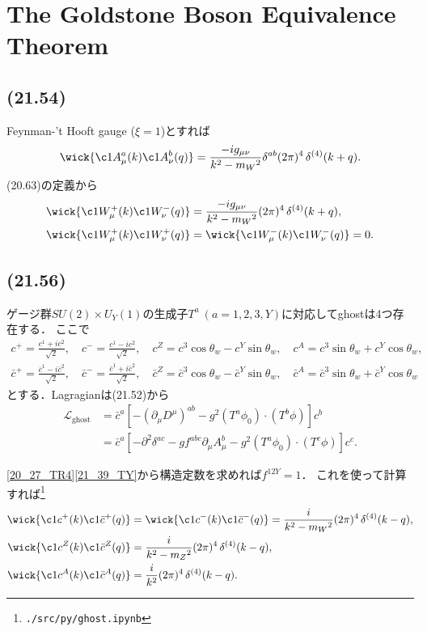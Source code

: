 \section{The Goldstone Boson Equivalence Theorem}
\subsection{(21.54)}
Feynman-'t Hooft gauge (\(\xi=1\))とすれば
\[
\wick{ \c1{A^a_\mu}(k) \c1{A^b_\nu}(q) } =  \frac{-ig_{\mu\nu}}{k^2-m_W{}^2} \delta^{ab} (2\pi)^4 \mathop{\delta^{(4)}}(k+q) .
\]
(20.63)の定義から
\begin{align*}
  \wick{ \c1{W^+_\mu}(k) \c1{W^-_\nu}(q) } &= \frac{-ig_{\mu\nu}}{k^2-m_W{}^2} (2\pi)^4 \mathop{\delta^{(4)}}(k+q) , \\
  \wick{ \c1{W^+_\mu}(k) \c1{W^+_\nu}(q) } &= \wick{ \c1{W^-_\mu}(k) \c1{W^-_\nu}(q) } = 0.
\end{align*}

\subsection{(21.56)}
ゲージ群\(SU(2)\times U_Y(1)\)の生成子\(T^a~(a=1, 2, 3, Y)\)に対応してghostは4つ存在する．
ここで
\begin{gather*}
  c^+ = \frac{c^1+ic^2}{\sqrt{2}} , \quad c^- = \frac{c^1-ic^2}{\sqrt{2}} , \quad
  c^Z = c^3 \cos\theta_w - c^Y \sin\theta_w , \quad c^A = c^3 \sin\theta_w + c^Y \cos\theta_w , \\
  \bar{c}^+ = \frac{\bar{c}^1-i\bar{c}^2}{\sqrt{2}} , \quad \bar{c}^- = \frac{\bar{c}^1+i\bar{c}^2}{\sqrt{2}} , \quad
  \bar{c}^Z = \bar{c}^3 \cos\theta_w - \bar{c}^Y \sin\theta_w , \quad \bar{c}^A = \bar{c}^3 \sin\theta_w + \bar{c}^Y \cos\theta_w
\end{gather*}
とする．Lagragianは(21.52)から
\begin{align*}
  \mathcal{L}_\text{ghost}
  &= \bar{c}^a \left[ - (\partial_\mu D^\mu)^{ab} - g^2 (T^a\phi_0) \cdot (T^b\phi) \right] c^b \\
  &= \bar{c}^a \left[ - \partial^2 \delta^{ac} - g f^{abc} \partial_\mu A^b_\mu - g^2 (T^a\phi_0) \cdot (T^c\phi) \right] c^c .
\end{align*}

\eqref{20_27_TR4}\eqref{21_39_TY}から構造定数を求めれば\(f^{12Y} = 1\)．
これを使って計算すれば\footnote{\verb|./src/py/ghost.ipynb|}
\begin{align}
  \begin{split}
    \wick{ \c1{c^+}(k) \c1{\bar{c}^+}(q) } &= \wick{ \c1{c^-}(k) \c1{\bar{c}^-}(q) } = \frac{i}{k^2-m_W{}^2} (2\pi)^4 \mathop{\delta^{(4)}}(k-q) , \\
    \wick{ \c1{c^Z}(k) \c1{\bar{c}^Z}(q) } &= \frac{i}{k^2-m_Z{}^2} (2\pi)^4 \mathop{\delta^{(4)}}(k-q) , \\
    \wick{ \c1{c^A}(k) \c1{\bar{c}^A}(q) } &= \frac{i}{k^2} (2\pi)^4 \mathop{\delta^{(4)}}(k-q) .
  \end{split}
  \label{21_56_eigen_ghost_propagator}
\end{align}

